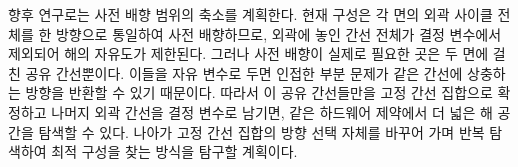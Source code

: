 \documentclass[twocolumn,a4paper]{article}
\begin{document}
향후 연구로는 사전 배향 범위의 축소를 계획한다. 현재 구성은 각 면의 외곽 사이클 전체를 한 방향으로 통일하여 사전 배향하므로, 외곽에 놓인 간선 전체가 결정 변수에서 제외되어 해의 자유도가 제한된다. 그러나 사전 배향이 실제로 필요한 곳은 두 면에 걸친 공유 간선뿐이다. 이들을 자유 변수로 두면 인접한 부분 문제가 같은 간선에 상충하는 방향을 반환할 수 있기 때문이다. 따라서 이 공유 간선들만을 고정 간선 집합으로 확정하고 나머지 외곽 간선을 결정 변수로 남기면, 같은 하드웨어 제약에서 더 넓은 해 공간을 탐색할 수 있다. 나아가 고정 간선 집합의 방향 선택 자체를 바꾸어 가며 반복 탐색하여 최적 구성을 찾는 방식을 탐구할 계획이다.



\end{document}
